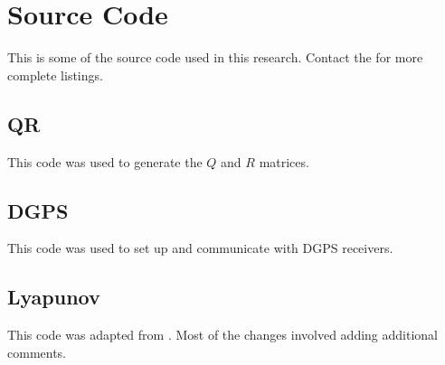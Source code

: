 \chapter{Source Code}
\label{ch:code}
This is some of the source code used in this research. Contact the  for more complete listings.

\section{QR}
\label{sec:qrcode}
This code was used to generate the $Q$ and $R$ matrices.
\lstset{language=C++}

\clearpage
\section{DGPS}
\label{sec:dgpscode}
This code was used to set up and communicate with DGPS receivers.

\clearpage
\section{Lyapunov}
\label{sec:lyapunovcode}
This code was adapted from \cite{Rusu05RobotuxLyapunov}. Most of the changes involved adding additional comments.
\lstset{language=Matlab}
